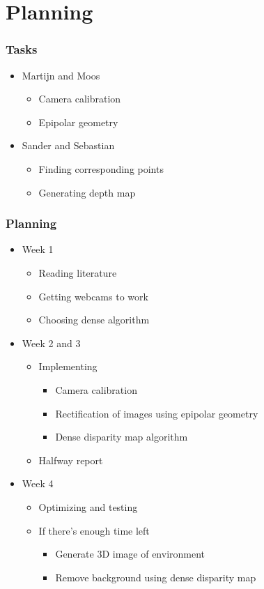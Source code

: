 \documentclass{beamer}
\begin{document}
\section{Planning}

\frame
{
  \frametitle{Tasks}
  \begin{itemize}
    \item Martijn and Moos
    \begin{itemize}
      \item Camera calibration
      \item Epipolar geometry
    \end{itemize}
    \item Sander and Sebastian
    \begin{itemize}
      \item Finding corresponding points
      \item Generating depth map
    \end{itemize}
  \end{itemize}
}

\frame
{
  \frametitle{Planning}
  \begin{itemize}
    \item Week 1
      \begin{itemize}
        \item Reading literature
        \item Getting webcams to work
        \item Choosing dense algorithm
      \end{itemize}
    \item Week 2 and 3
      \begin{itemize}
        \item Implementing
          \begin{itemize}
            \item Camera calibration
            \item Rectification of images using epipolar geometry
            \item Dense disparity map algorithm
          \end{itemize}
        \item Halfway report
      \end{itemize}
    \item Week 4
      \begin{itemize}
        \item Optimizing and testing
        \item If there's enough time left
          \begin{itemize}
            \item Generate 3D image of environment
            \item Remove background using dense disparity map
          \end{itemize}
      \end{itemize}
  \end{itemize}
}
\end{document}
